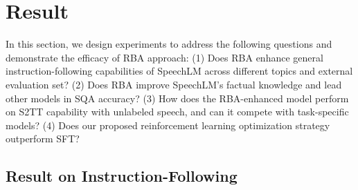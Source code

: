 \documentclass[letterpaper]{article} %
\begin{document}
\section{Result}
In this section, we design experiments to address the following questions and demonstrate the efficacy of RBA approach: (1) Does RBA enhance general instruction-following capabilities of SpeechLM across different topics and external evaluation set? (2) Does RBA improve SpeechLM's factual knowledge and lead other models in SQA accuracy? (3) How does the RBA-enhanced model perform on S2TT capability with unlabeled speech, and can it compete with task-specific models? (4) Does our proposed reinforcement learning optimization strategy outperform SFT?
\subsection{Result on Instruction-Following}
\end{document}
